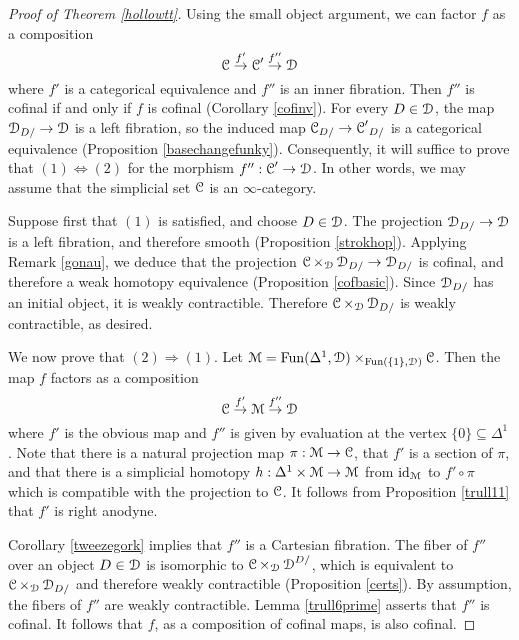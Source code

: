 \begin{proof}[Proof of Theorem \ref{hollowtt}]
Using the small object argument, we can factor $f$ as a composition
$$ \operatorname{\mathcal{C}} \stackrel{f'}{\rightarrow} \operatorname{\mathcal{C}}' \stackrel{f''}{\rightarrow} \operatorname{\mathcal{D}}$$
where $f'$ is a categorical equivalence and $f''$ is an inner fibration. Then $f''$ is cofinal if and only if $f$ is cofinal (Corollary \ref{cofinv}). For every $D \in \operatorname{\mathcal{D}}$, the map
$\operatorname{\mathcal{D}}_{D/} \rightarrow \operatorname{\mathcal{D}}$ is a left fibration, so the induced map
$\operatorname{\mathcal{C}}_{D/} \rightarrow {\operatorname{\mathcal{C}}'}_{D/}$ is a categorical equivalence (Proposition \ref{basechangefunky}). Consequently, it will suffice to prove that $(1) \Leftrightarrow (2)$ for the morphism $f'': \operatorname{\mathcal{C}}' \rightarrow \operatorname{\mathcal{D}}$. In other words, we may assume that the simplicial set $\operatorname{\mathcal{C}}$ is an $\infty$-category.

Suppose first that $(1)$ is satisfied, and choose $D \in \operatorname{\mathcal{D}}$. The projection
$\operatorname{\mathcal{D}}_{D/} \rightarrow \operatorname{\mathcal{D}}$ is a left fibration, and therefore smooth (Proposition \ref{strokhop}). Applying Remark \ref{gonau}, we deduce that the projection
$\operatorname{\mathcal{C}} \times_{\operatorname{\mathcal{D}}} \operatorname{\mathcal{D}}_{D/} \rightarrow \operatorname{\mathcal{D}}_{D/}$ is cofinal, and therefore a weak homotopy equivalence (Proposition \ref{cofbasic}). Since $\operatorname{\mathcal{D}}_{D/}$ has an initial object, it is weakly contractible. Therefore $\operatorname{\mathcal{C}} \times_{\operatorname{\mathcal{D}}} \operatorname{\mathcal{D}}_{D/}$ is weakly contractible, as desired.

We now prove that $(2) \Rightarrow (1)$.
Let $\operatorname{\mathcal{M}} = \operatorname{Fun}(\Delta^1,\operatorname{\mathcal{D}}) \times_{ \operatorname{Fun}( \{1\}, \operatorname{\mathcal{D}} )} \operatorname{\mathcal{C}}$. Then the map $f$ factors as a composition
$$ \operatorname{\mathcal{C}} \stackrel{f'}{\rightarrow} \operatorname{\mathcal{M}} \stackrel{f''}{\rightarrow} \operatorname{\mathcal{D}}$$
where $f'$ is the obvious map and $f''$ is given by evaluation at the vertex $\{0\} \subseteq
\Delta^1$. Note that there is a natural projection map $\pi: \operatorname{\mathcal{M}} \rightarrow \operatorname{\mathcal{C}}$, that
$f'$ is a section of $\pi$, and that there is a simplicial homotopy
$h: \Delta^1 \times \operatorname{\mathcal{M}} \rightarrow \operatorname{\mathcal{M}}$ from $\operatorname{id}_{\operatorname{\mathcal{M}}}$ to $f' \circ \pi$
which is compatible with the projection to $\operatorname{\mathcal{C}}$. It follows from
Proposition \ref{trull11} that $f'$ is right anodyne.

Corollary \ref{tweezegork} implies that $f''$ is a Cartesian fibration. 
The fiber of $f''$ over an object $D \in \operatorname{\mathcal{D}}$ is isomorphic to $\operatorname{\mathcal{C}} \times_{\operatorname{\mathcal{D}}} \operatorname{\mathcal{D}}^{D/}$, 
which is equivalent to $\operatorname{\mathcal{C}} \times_{\operatorname{\mathcal{D}}} \operatorname{\mathcal{D}}_{D/}$ and therefore weakly contractible (Proposition \ref{certs}). By assumption, the fibers of $f''$ are weakly contractible.
Lemma \ref{trull6prime} asserts that $f''$ is cofinal. It follows that $f$, as a composition of cofinal maps, is also cofinal.
\end{proof}


